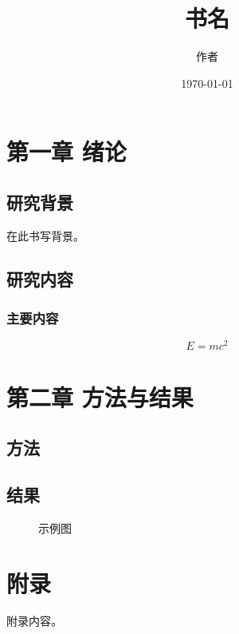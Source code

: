 \documentclass{ctexbook}
\title{书名}
\author{作者}
\date{\today}
\begin{document}
\frontmatter
\maketitle
\tableofcontents

\mainmatter

\chapter{第一章 绪论}

\section{研究背景}

在此书写背景。

\section{研究内容}

\subsection{主要内容}

\begin{equation}
  E = mc^2
\end{equation}

\chapter{第二章 方法与结果}

\section{方法}

\section{结果}

\begin{figure}[h]
  \centering
  \caption{示例图}
\end{figure}

\backmatter

\chapter{附录}

附录内容。
\end{document}
